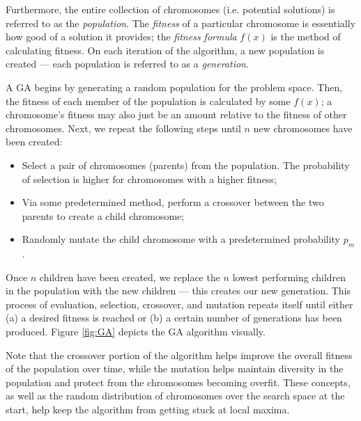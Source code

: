 Furthermore, the entire collection of chromosomes (i.e. potential solutions) is referred to as the \textit{population}.  The \textit{fitness} of a particular chromosome is essentially how good of a solution it provides; the \textit{fitness formula} $f(x)$ is the method of calculating fitness.  On each iteration of the algorithm, a new population is created --- each population is referred to as a \textit{generation}.

A GA begins by generating a random population for the problem space.  Then, the fitness of each member of the population is calculated by some $f(x)$; a chromosome's fitness may also just be an amount relative to the fitness of other chromosomes.  Next, we repeat the following steps until $n$ new chromosomes have been created:
\begin{itemize}
\item Select a pair of chromosomes (parents) from the population.  The probability of selection is higher for chromosomes with a higher fitness;
\item Via some predetermined method, perform a crossover between the two parents to create a child chromosome;
\item Randomly mutate the child chromosome with a predetermined probability $p_m$.
\end{itemize}

Once $n$ children have been created, we replace the $n$ lowest performing children in the population with the new children --- this creates our new generation.  This process of evaluation, selection, crossover, and mutation repeats itself until either (a) a desired fitness is reached or (b) a certain number of generations has been produced.  Figure \ref{fig:GA} depicts the GA algorithm visually.

Note that the crossover portion of the algorithm helps improve the overall fitness of the population over time, while the mutation helps maintain diversity in the population and protect from the chromosomes becoming overfit.  These concepts, as well as the random distribution of chromosomes over the search space  at the start, help keep the algorithm from getting stuck at local maxima.

